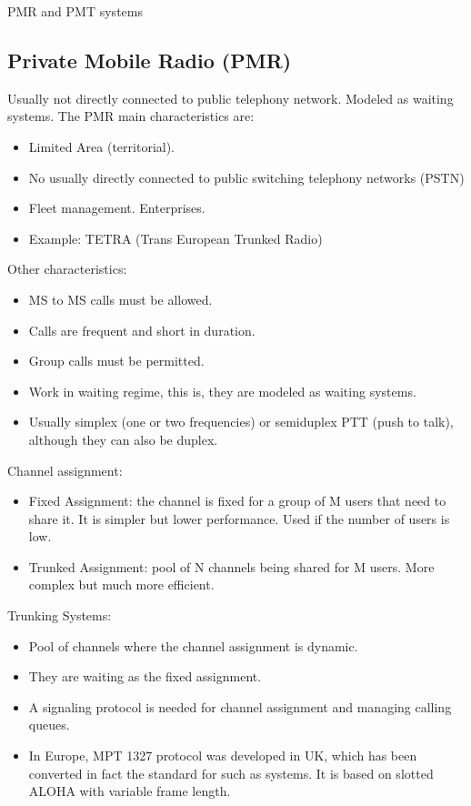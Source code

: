 \documentclass[
	12pt,
	twoside
]{book}
\begin{document}
PMR and PMT systems

\subsection{Private Mobile Radio (PMR)}

Usually not directly connected to public telephony network. Modeled as waiting systems. The PMR main characteristics are:

\begin{itemize}
	\item Limited Area (territorial).
	\item No usually directly connected to public switching telephony networks (PSTN)
	\item Fleet management. Enterprises.
	\item Example: TETRA (Trans European Trunked Radio)
\end{itemize}

Other characteristics:

\begin{itemize}
	\item MS to MS calls must be allowed.
	\item Calls are frequent and short in duration.
	\item Group calls must be permitted.
	\item Work in waiting regime, this is, they are modeled as waiting systems.
	\item Usually simplex (one or two frequencies) or semiduplex PTT (push to talk), although they can also be duplex.
\end{itemize}

Channel assignment:

\begin{itemize}
	\item Fixed Assignment: the channel is fixed for a group of M users that need to share it. It is simpler but lower performance. Used if the number of users is low.
	\item Trunked Assignment: pool of N channels being shared for M users. More complex but much more efficient.
\end{itemize}

Trunking Systems:

\begin{itemize}
	\item Pool of channels where the channel assignment is dynamic.
	\item They are waiting as the fixed assignment.
	\item A signaling protocol is needed for channel assignment and managing calling queues.
	\item In Europe, MPT 1327 protocol was developed in UK, which has been converted in fact the standard for such as systems. It is based on slotted ALOHA with variable frame length.
\end{itemize}
\end{document}
